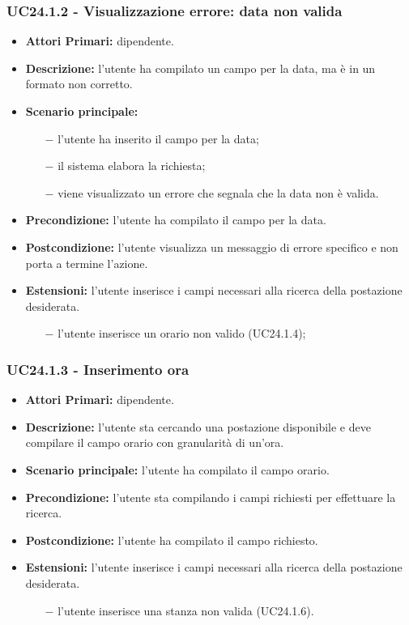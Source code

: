\subsubsection{ UC24.1.2 - Visualizzazione errore: data non valida  }
\begin{itemize}
	\item\textbf{Attori Primari:} dipendente.
	\item\textbf{Descrizione:} l’utente ha compilato un campo per la data, ma è in un formato non corretto.
	\item\textbf{Scenario principale:} 
	\begin{itemize}
		\item[$-$] l’utente ha inserito il campo per la data;
		\item[$-$] il sistema elabora la richiesta;
		\item[$-$] viene visualizzato un errore che segnala che la data non è valida.
	\end{itemize}
	\item\textbf{Precondizione:} l’utente ha compilato il campo per la data.
	\item\textbf{Postcondizione:} l’utente visualizza un messaggio di errore specifico e non porta a termine l’azione.
	\item\textbf{Estensioni:} l’utente inserisce i campi necessari alla ricerca della postazione desiderata.
	\begin{itemize}
		\item[$-$] l’utente inserisce un orario non valido (UC24.1.4);
	\end{itemize}
\end{itemize}
\subsubsection{ UC24.1.3 - Inserimento ora }
\begin{itemize}
	\item\textbf{Attori Primari:} dipendente.
	\item\textbf{Descrizione:} l’utente sta cercando una postazione disponibile e deve compilare il campo orario con granularità di un'ora.
	\item\textbf{Scenario principale:} l’utente ha compilato il campo orario.
	\item\textbf{Precondizione:} l’utente sta compilando i campi richiesti per effettuare la ricerca.
	\item\textbf{Postcondizione:} l’utente ha compilato il campo richiesto.
	\item\textbf{Estensioni:} l’utente inserisce i campi necessari alla ricerca della postazione desiderata.
	\begin{itemize}
		\item[$-$] l’utente inserisce una stanza non valida (UC24.1.6).
	\end{itemize}
\end{itemize}
